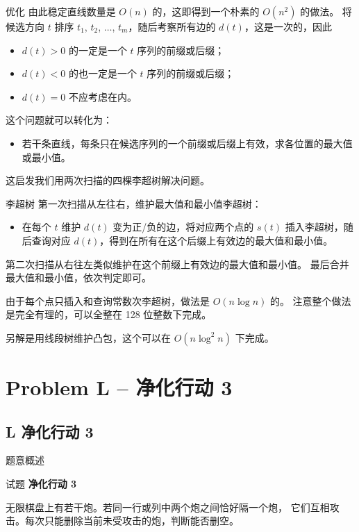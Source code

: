 \documentclass{beamer}
\newcommand{\TT}[1]{{\ttfamily #1}}
\newcommand{\BF}[1]{\textbf{#1}}
\begin{document}
{{\begin{frame}{优化}
  由此稳定直线数量是 $O(n)$ 的，这即得到一个朴素的 $O(n^2)$ 的做法。
  将候选方向 $t$ 排序 $t_1$, $t_2$, $\ldots$, $t_m$，随后考察所有边的 $d(t)$，这是一次的，因此
  \begin{itemize}
    \item $d(t) > 0$ 的一定是一个 $t$ 序列的前缀或后缀；
    \item $d(t) < 0$ 的也一定是一个 $t$ 序列的前缀或后缀；
    \item $d(t) = 0$ 不应考虑在内。
  \end{itemize}
  这个问题就可以转化为：
  \begin{itemize}
    \item 若干条直线，每条只在候选序列的一个前缀或后缀上有效，求各位置的最大值或最小值。
  \end{itemize}

  这启发我们用两次扫描的四棵李超树解决问题。
\end{frame}
\begin{frame}{李超树}
  第一次扫描从左往右，维护最大值和最小值李超树：
  \begin{itemize}
    \item 在每个 $t$ 维护 $d(t)$ 变为正/负的边，将对应两个点的 $s(t)$ 插入李超树，随后查询对应 $d(t)$，得到在所有在这个后缀上有效边的最大值和最小值。
  \end{itemize}
  第二次扫描从右往左类似维护在这个前缀上有效边的最大值和最小值。
  最后合并最大值和最小值，依次判定即可。

  由于每个点只插入和查询常数次李超树，做法是 $O(n \log n)$ 的。
  注意整个做法是完全有理的，可以全整在 128 位整数下完成。

  另解是用线段树维护凸包，这个可以在 $O(n \log^2 n)$ 下完成。

\end{frame}
}

{
\section[L]{Problem L -- 净化行动 3}
\subsection{L 净化行动 3}
\begin{frame}{题意概述}
  \begin{center}试题 \myboxxii{\BF{\TT{L}}} \BF{净化行动 3}\end{center}
  无限棋盘上有若干炮。若同一行或列中两个炮之间恰好隔一个炮，
  它们互相攻击。每次只能删除当前未受攻击的炮，判断能否删空。
\end{frame}


}}
\end{document}
